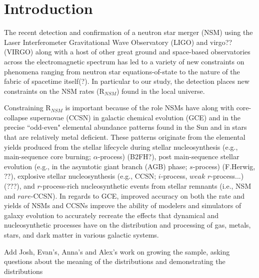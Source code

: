 \section{Introduction}
\label{intro} 
The recent detection and confirmation of a neutron star merger (NSM) using the Laser Interferometer Gravitational Wave Observatory (LIGO) and virgo?? (VIRGO) along with a host of other great ground and space-based observatories across the electromagnetic spectrum has led to a variety of new constraints on phenomena ranging from neutron star equations-of-state to the nature of the fabric of spacetime itself(?). In particular to our study, the detection places new constraints on the NSM rates (R$_{NSM}$) found in the local universe. 

Constraining R$_{NSM}$ is important because of the role NSMs have along with core-collapse supernovae (CCSN) in galactic chemical evolution (GCE) and in the precise ``odd-even" elemental abundance patterns found in the Sun and in stars that are relatively metal deficient. These patterns originate from the elemental yields produced from the stellar lifecycle during stellar nucleosynthesis (e.g., main-sequence core burning; $\alpha$-process) (B2FH?), post main-sequence stellar evolution (e.g., in the asymtotic giant branch (AGB) phase; $s$-process) (F.Herwig, ??), explosive stellar nucleosynthesis (e.g., CCSN; $i$-process, $weak$ $r$-process...) (???), and $r$-process-rich nucleosynthetic events from stellar remnants (i.e., NSM and $rare$-CCSN). In regards to GCE, improved accuracy on both the rate and yields of NSMs and CCSNs improve the ability of modelers and simulators of galaxy evolution to accurately recreate the effects that dynamical and nucleosynthetic processes have on the distribution and processing of gas, metals, stars, and dark matter in various galactic systems.

Add Josh, Evan's, Anna's and Alex's work on growing the sample, asking questions about the meaning of the distributions and demonstrating the distributions 

